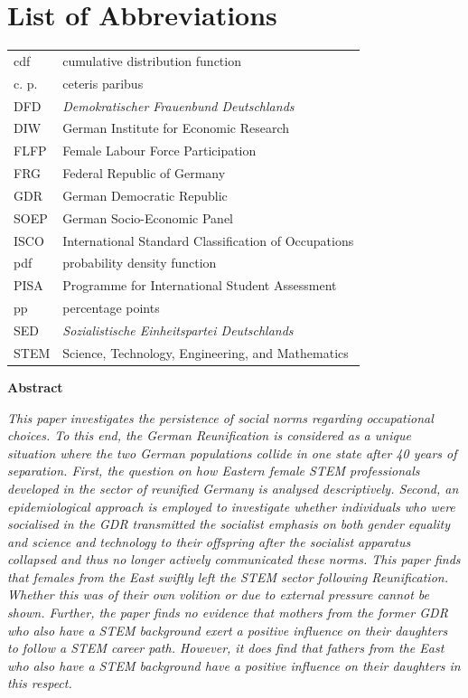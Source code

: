 \documentclass[a4paper, oneside, hyperfootnotes = false]{article}
\begin{document}
{{\section*{List of Abbreviations}
\noindent\begin{tabular}{@{}ll}
	cdf & cumulative distribution function \\
	c. p. & ceteris paribus \\
	DFD & \emph{Demokratischer Frauenbund Deutschlands} \\
    DIW & German Institute for Economic Research \\
    FLFP & Female Labour Force Participation \\
    FRG & Federal Republic of Germany \\
    GDR & German Democratic Republic \\
    SOEP & German Socio-Economic Panel \\
    ISCO & International Standard Classification of Occupations \\
    pdf & probability density function \\
    PISA & Programme for International Student Assessment \\
    pp & percentage points \\
    SED & \emph{Sozialistische Einheitspartei Deutschlands} \\
    STEM & Science, Technology, Engineering, and Mathematics
\end{tabular}

\newpage

\renewcommand\thesection{\arabic{section}}
\begin{center}
{\large\bfseries Abstract}
{}

\vspace{5mm}

\parbox{400pt}{
    \emph{\noindent This paper investigates the persistence of social norms regarding occupational choices. To this end, the German Reunification is considered as a unique situation where the two German populations collide in one state after 40 years of separation. First, the question on how Eastern female STEM professionals developed in the sector of reunified Germany is analysed descriptively. Second, an epidemiological approach is employed to investigate whether individuals who were socialised in the GDR transmitted the socialist emphasis on both gender equality and science and technology  to their offspring after the socialist apparatus collapsed and thus no longer actively communicated these norms. This paper finds that females from the East swiftly left the STEM sector following Reunification. Whether this was of their own volition or due to external pressure cannot be shown. Further, the paper finds no evidence that mothers from the former GDR who also have a STEM background exert a positive influence on their daughters to follow a STEM career path. However, it does find that fathers from the East who also have a STEM background have a positive influence on their daughters in this respect.
    }
}


\end{center}}}
\end{document}
